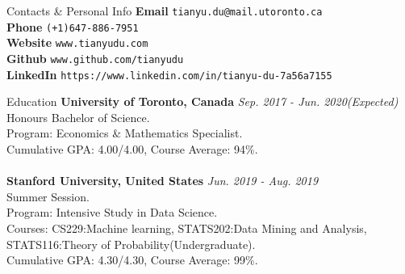 \documentclass{resume} %
\begin{document}
\begin{rSection}{Contacts \& Personal Info}
	\textbf{Email} \texttt{tianyu.du@mail.utoronto.ca}
	\\
	\textbf{Phone} \texttt{(+1)647-886-7951}
	\\
	\textbf{Website} \texttt{www.tianyudu.com}
	\\
	\textbf{Github} \texttt{www.github.com/tianyudu}
	\\
	\textbf{LinkedIn} \texttt{https://www.linkedin.com/in/tianyu-du-7a56a7155}
\end{rSection}


\begin{rSection}{Education}
{\bf University of Toronto, Canada} \hfill {\em Sep. 2017 - Jun. 2020(Expected)} 
\\ Honours Bachelor of Science.
\\ Program: Economics \& Mathematics Specialist.
\\ Cumulative GPA: 4.00/4.00, Course Average: 94\%.
\\
\\{\bf Stanford University, United States} \hfill {\em Jun. 2019 - Aug. 2019} 
\\ Summer Session.
\\ Program: Intensive Study in Data Science.
\\ Courses: CS229:Machine learning, STATS202:Data Mining and Analysis, STATS116:Theory of Probability(Undergraduate).
\\ Cumulative GPA: 4.30/4.30, Course Average: 99\%.


\end{rSection}
\end{document}
